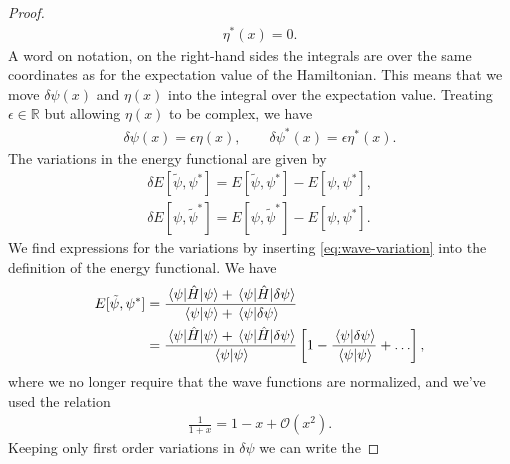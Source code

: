 \begin{proof}
\begin{gather}
{                }
                \eta^{*}(x)
                = 0.
            \end{gather}
            A word on notation, on the right-hand sides the integrals are over
            the same coordinates as for the expectation value of the
            Hamiltonian.
            This means that we move $\delta\psi(x)$ and $\eta(x)$ into the
            integral over the expectation value.
            Treating $\epsilon \in \mathbb{R}$ but allowing $\eta(x)$ to be
            complex, we have
            \begin{gather}
                \delta\psi(x) = \epsilon\eta(x),
                \qquad
                \delta\psi^{*}(x) = \epsilon\eta^{*}(x).
            \end{gather}
            The variations in the energy functional are given by
            \begin{gather}
                \delta E[\tilde{\psi}, \psi^{*}]
                = E[\tilde{\psi}, \psi^{*}]
                - E[\psi, \psi^{*}], \\
                \delta E[\psi, \tilde{\psi}^{*}]
                = E[\psi, \tilde{\psi}^{*}]
                - E[\psi, \psi^{*}].
            \end{gather}
            We find expressions for the variations by inserting
            \autoref{eq:wave-variation} into the definition of the energy
            functional.
            We have
            \begin{align}
                E[\tilde{\psi}, \psi^{*}]
                &= \frac{
                    \mel*{\psi}{\hamil}{\psi}
                    + \mel*{\psi}{\hamil}{\delta\psi}
                }{
                    \braket*{\psi}
                    + \braket*{\psi}{\delta\psi}
                }
                \\
                &= \frac{
                    \mel*{\psi}{\hamil}{\psi}
                    + \mel*{\psi}{\hamil}{\delta\psi}
                }{
                    \braket*{\psi}
                }\brak{
                    1 - \frac{\braket*{\psi}{\delta\psi}}{\braket*{\psi}}
                    + \dots
                },
            \end{align}
            where we no longer require that the wave functions are normalized,
            and we've used the relation
            \begin{align}
                \frac{1}{1 + x} = 1 - x + \mathcal{O}(x^2).
            \end{align}
            Keeping only first order variations in $\delta\psi$ we can write the

\end{proof}
